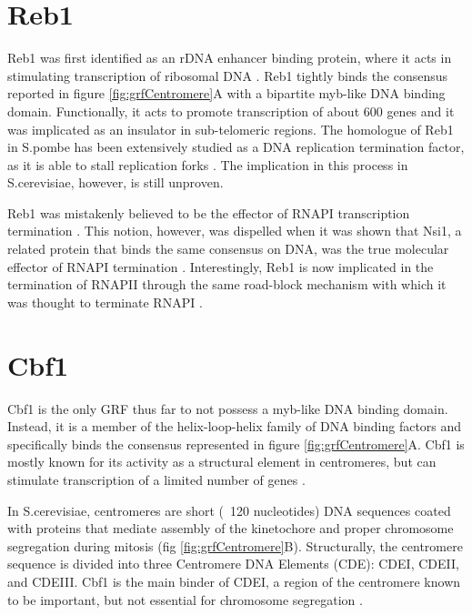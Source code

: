 \section{Reb1}

Reb1 was first identified as an rDNA enhancer binding protein, where it acts in stimulating transcription of ribosomal DNA \cite{planta:1995:global}. 
Reb1 tightly binds the consensus reported in figure \ref{fig:grfCentromere}A with a bipartite myb-like DNA binding domain.
Functionally, it acts to promote transcription of about 600 genes and it was implicated as an insulator in sub-telomeric regions. 
The homologue of Reb1 in S.pombe has been extensively studied as a DNA replication termination factor, as it is able to stall replication forks \cite{sa:2004:transcription}. The implication in this process in S.cerevisiae, however, is still unproven.


Reb1 was mistakenly believed to be the effector of RNAPI transcription termination \cite{lang:1995:transcription}. 
This notion, however, was dispelled when it was shown that Nsi1, a related protein that binds the same consensus on DNA, was the true molecular effector of RNAPI termination \cite{reiter:2012:reb1homologue}. 
Interestingly, Reb1 is now implicated in the termination of RNAPII through the same road-block mechanism with which it was thought to terminate RNAPI \cite{colin:2014:roadblock}.


\section{Cbf1}

Cbf1 is the only GRF thus far to not possess a myb-like DNA binding domain. Instead, it is a member of the helix-loop-helix family of DNA binding factors and specifically binds the consensus represented in figure \ref{fig:grfCentromere}A. 
Cbf1 is mostly known for its activity as a structural element in centromeres, but can stimulate transcription of a limited number of genes \cite{mellor:1990:cpf1}.


In S.cerevisiae, centromeres are short (~120 nucleotides) DNA sequences coated with proteins that mediate assembly of the kinetochore and proper chromosome segregation during mitosis (fig \ref{fig:grfCentromere}B). 
Structurally, the centromere sequence is divided into three Centromere DNA Elements (CDE): CDEI, CDEII, and CDEIII. Cbf1 is the main binder of CDEI, a region of the centromere known to be important, but not essential for chromosome segregation \cite{niedenthal:1993:cpf1}. 

